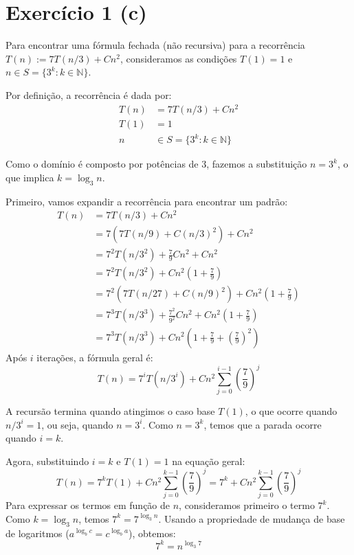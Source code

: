 \documentclass[a4paper,12pt]{article}
\begin{document}
\section*{Exercício 1 (c)}

Para encontrar uma fórmula fechada (não recursiva) para a recorrência $T(n) := 7T(n/3) + Cn^2$, consideramos as condições $T(1) = 1$ e $n \in S = \{3^k : k \in \mathbb{N}\}$.

Por definição, a recorrência é dada por:
\begin{align}
    T(n) &= 7T(n/3) + Cn^2 \\
    T(1) &= 1 \\
    n &\in S = \{3^k : k \in \mathbb{N}\}
\end{align}

Como o domínio é composto por potências de 3, fazemos a substituição $n = 3^k$, o que implica $k = \log_3 n$.

Primeiro, vamos expandir a recorrência para encontrar um padrão:
\begin{align*}
T(n) &= 7T(n/3) + Cn^2 \\
     &= 7\left( 7T(n/9) + C(n/3)^2 \right) + Cn^2 \\
     &= 7^2 T(n/3^2) + \frac{7}{9}Cn^2 + Cn^2 \\
     &= 7^2 T(n/3^2) + Cn^2 \left(1 + \frac{7}{9}\right) \\
     &= 7^2 \left( 7T(n/27) + C(n/9)^2 \right) + Cn^2 \left(1 + \frac{7}{9}\right) \\
     &= 7^3 T(n/3^3) + \frac{7^2}{9^2}Cn^2 + Cn^2 \left(1 + \frac{7}{9}\right) \\
     &= 7^3 T(n/3^3) + Cn^2 \left(1 + \frac{7}{9} + \left(\frac{7}{9}\right)^2\right)
\end{align*}
Após $i$ iterações, a fórmula geral é:
\begin{equation}
T(n) = 7^i T(n/3^i) + Cn^2 \sum_{j=0}^{i-1} \left(\frac{7}{9}\right)^j
\end{equation}

A recursão termina quando atingimos o caso base $T(1)$, o que ocorre quando $n/3^i = 1$, ou seja, quando $n = 3^i$. Como $n = 3^k$, temos que a parada ocorre quando $i = k$.

Agora, substituindo $i=k$ e $T(1)=1$ na equação geral:
\begin{equation}
T(n) = 7^k T(1) + Cn^2 \sum_{j=0}^{k-1} \left(\frac{7}{9}\right)^j = 7^k + Cn^2 \sum_{j=0}^{k-1} \left(\frac{7}{9}\right)^j
\end{equation}
Para expressar os termos em função de $n$, consideramos primeiro o termo $7^k$. Como $k = \log_3 n$, temos $7^k = 7^{\log_3 n}$. Usando a propriedade de mudança de base de logaritmos ($a^{\log_b c} = c^{\log_b a}$), obtemos:
\begin{equation}
7^k = n^{\log_3 7}
\end{equation}
\end{document}
